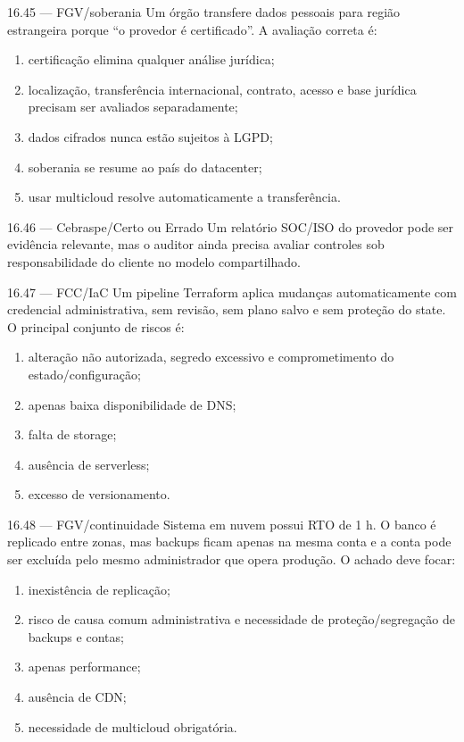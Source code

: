 \begin{questao}{ 16.45 — FGV/soberania}
Um órgão transfere dados pessoais para região estrangeira porque ``o provedor é certificado''. A avaliação correta é:
\begin{enumerate}[label=\Alph*)]
\item certificação elimina qualquer análise jurídica;
\item localização, transferência internacional, contrato, acesso e base jurídica precisam ser avaliados separadamente;
\item dados cifrados nunca estão sujeitos à LGPD;
\item soberania se resume ao país do datacenter;
\item usar multicloud resolve automaticamente a transferência.
\end{enumerate}
\end{questao}

\begin{questao}{ 16.46 — Cebraspe/Certo ou Errado}
Um relatório SOC/ISO do provedor pode ser evidência relevante, mas o auditor ainda precisa avaliar controles sob responsabilidade do cliente no modelo compartilhado.
\end{questao}

\begin{questao}{ 16.47 — FCC/IaC}
Um pipeline Terraform aplica mudanças automaticamente com credencial administrativa, sem revisão, sem plano salvo e sem proteção do state. O principal conjunto de riscos é:
\begin{enumerate}[label=\Alph*)]
\item alteração não autorizada, segredo excessivo e comprometimento do estado/configuração;
\item apenas baixa disponibilidade de DNS;
\item falta de storage;
\item ausência de serverless;
\item excesso de versionamento.
\end{enumerate}
\end{questao}

\begin{questao}{ 16.48 — FGV/continuidade}
Sistema em nuvem possui RTO de 1 h. O banco é replicado entre zonas, mas backups ficam apenas na mesma conta e a conta pode ser excluída pelo mesmo administrador que opera produção. O achado deve focar:
\begin{enumerate}[label=\Alph*)]
\item inexistência de replicação;
\item risco de causa comum administrativa e necessidade de proteção/segregação de backups e contas;
\item apenas performance;
\item ausência de CDN;
\item necessidade de multicloud obrigatória.
\end{enumerate}
\end{questao}

